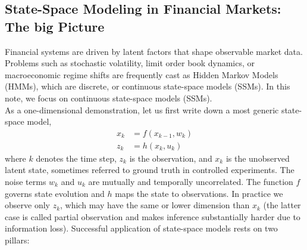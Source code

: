 \documentclass{article}
\begin{document}
\subsection{State-Space Modeling in Financial Markets: The big Picture}
Financial systems are driven by latent factors that shape observable market data. Problems such as stochastic volatility, limit order book dynamics, or macroeconomic regime shifts are frequently cast as Hidden Markov Models (HMMs), which are discrete, or continuous state-space models (SSMs). In this note, we focus on continuous state-space models (SSMs). \\[10pt]
As a one-dimensional demonstration, let us first write down a most generic state-space model,
\begin{equation}
\begin{split} \label{Eq:HMM}
     x_k &= f(x_{k-1}, w_k) \\
     z_k &= h(x_k, u_k)
\end{split}
\end{equation}
where $k$ denotes the time step, $z_k$ is the observation, and $x_k$ is the unobserved latent state, sometimes referred to ground truth in controlled experiments. The noise terms $w_k$ and $u_k$ are mutually and temporally uncorrelated. The function $f$ governs state evolution and $h$ maps the state to observations. In practice we observe only $z_k$, which may have the same or lower dimension than $x_k$ (the latter case is called partial observation and makes inference substantially harder due to information loss). Successful application of state-space models rests on two pillars:
\end{document}

